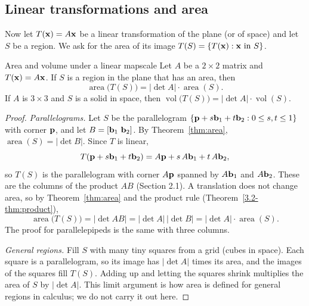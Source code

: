 \documentclass[11pt]{article}
\begin{document}
\subsection*{Linear transformations and area}

Now let $T(\mathbf{x})=A\mathbf{x}$ be a linear transformation of the plane (or of space) and let $S$ be a region. We ask for the area of its image $T(S)=\{T(\mathbf{x}):\mathbf{x}\text{ in }S\}$.

\begin{thm}{Area and volume under a linear map}{scale}
Let $A$ be a $2\times2$ matrix and $T(\mathbf{x})=A\mathbf{x}$. If $S$ is a region in the plane that has an area, then
\[
\operatorname{area}\bigl(T(S)\bigr)=|\det A|\cdot\operatorname{area}(S).
\]
If $A$ is $3\times3$ and $S$ is a solid in space, then $\operatorname{vol}\bigl(T(S)\bigr)=|\det A|\cdot\operatorname{vol}(S)$.
\end{thm}

\begin{proof}
\emph{Parallelograms.} Let $S$ be the parallelogram $\{\mathbf{p}+s\mathbf{b}_1+t\mathbf{b}_2:0\leq s,t\leq1\}$ with corner $\mathbf{p}$, and let $B=[\mathbf{b}_1\ \mathbf{b}_2]$. By Theorem~\ref{thm:area}, $\operatorname{area}(S)=|\det B|$. Since $T$ is linear,
\[
T(\mathbf{p}+s\mathbf{b}_1+t\mathbf{b}_2)=A\mathbf{p}+s\,A\mathbf{b}_1+t\,A\mathbf{b}_2,
\]
so $T(S)$ is the parallelogram with corner $A\mathbf{p}$ spanned by $A\mathbf{b}_1$ and $A\mathbf{b}_2$. These are the columns of the product $AB$ (Section 2.1). A translation does not change area, so by Theorem~\ref{thm:area} and the product rule (Theorem~\ref{3.2-thm:product}),
\[
\operatorname{area}\bigl(T(S)\bigr)=|\det AB|=|\det A|\,|\det B|=|\det A|\cdot\operatorname{area}(S).
\]
The proof for parallelepipeds is the same with three columns.

\emph{General regions.} Fill $S$ with many tiny squares from a grid (cubes in space). Each square is a parallelogram, so its image has $|\det A|$ times its area, and the images of the squares fill $T(S)$. Adding up and letting the squares shrink multiplies the area of $S$ by $|\det A|$. This limit argument is how area is defined for general regions in calculus; we do not carry it out here.
\end{proof}
\end{document}
